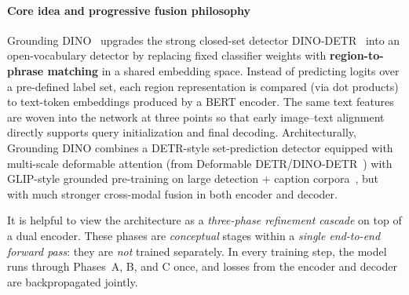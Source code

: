 \begin{enrichment}
\begin{enrichment}
\end{enrichment}
	
	\begin{enrichment}[Method][subsection]
		\label{enr:chapter14_groundingdino_method}
		
		\paragraph{Core idea and progressive fusion philosophy}
		
		Grounding DINO~\cite{liu2023_groundingdino} upgrades the strong closed-set detector DINO-DETR~\cite{zhang2022_dino} into an open-vocabulary detector by replacing fixed classifier weights with \textbf{region-to-phrase matching} in a shared embedding space. Instead of predicting logits over a pre-defined label set, each region representation is compared (via dot products) to text-token embeddings produced by a BERT encoder. The same text features are woven into the network at three points so that early image--text alignment directly supports query initialization and final decoding. Architecturally, Grounding DINO combines a DETR-style set-prediction detector equipped with multi-scale deformable attention (from Deformable DETR/DINO-DETR~\cite{zhu2021_deformabledetr,zhang2022_dino}) with GLIP-style grounded pre-training on large detection + caption corpora~\cite{li2022_glip}, but with much stronger cross-modal fusion in both encoder and decoder.
		
		It is helpful to view the architecture as a \emph{three-phase refinement cascade} on top of a dual encoder. These phases are \emph{conceptual} stages within a \emph{single end-to-end forward pass}: they are \emph{not} trained separately. In every training step, the model runs through Phases~A, B, and C once, and losses from the encoder and decoder are backpropagated jointly.
		
		\newpage
		

\end{enrichment}
\end{enrichment}
